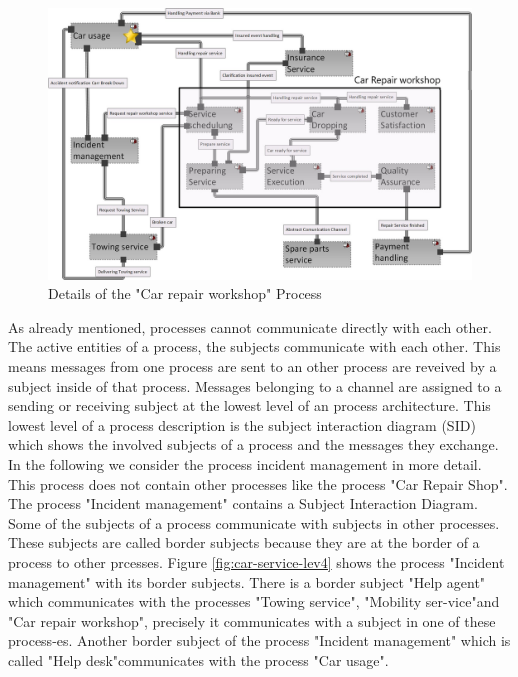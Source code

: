 \begin{figure}
	\centering
	\includegraphics[width=0.8\linewidth]{Figures/Chapter5/figures-hierarchy/Car-Service-Lev3}
	\caption[Details of the "Car repair workshop" Process]{Details of the "Car repair workshop" Process}
	\label{fig:car-service-lev3}
\end{figure}

As already mentioned, processes cannot communicate directly with each other. The active entities of a process, the subjects communicate with each other. This means messages from one process are sent to an other process are reveived by a subject inside of that process. Messages belonging to a channel are assigned to a sending or receiving subject at the lowest level of an process architecture. This lowest level of a process description is the subject interaction diagram (SID) which shows the involved subjects of a process and the messages they exchange. In the following we consider the process incident management in more detail. This process does not contain other processes like the process "Car Repair Shop". The process "Incident management" contains a Subject Interaction Diagram. Some of the subjects of a process communicate with subjects in other processes. These subjects are called border subjects because they are at the border of a process to other prcesses. Figure \ref{fig:car-service-lev4} shows the process "Incident management" with its border subjects. There is a border subject "Help agent" which communicates with the processes "Towing service", "Mobility ser-vice"and  "Car repair workshop", precisely it communicates with a subject in one of these process-es. Another border subject of the process "Incident management" which is called "Help desk"communicates with the process "Car usage".\\

